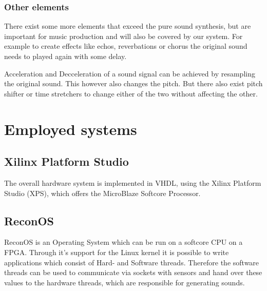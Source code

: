 			\subsubsection{Other elements}
				There exist some more elements that exceed the pure sound synthesis, but are important for music production and will also be covered by our system.
				For example to create effects like echos, reverbations or chorus the original sound needs to played again with some delay.
			
				Acceleration and Decceleration of a sound signal can be achieved by resampling the original sound. This however also changes the pitch.
				But there also exist pitch shifter or time stretchers to change either of the two without affecting the other.
		
		
		
			
			
			
		
	\section{Employed systems}
	  \subsection{Xilinx Platform Studio}
	    The overall hardware system is implemented in VHDL, using the Xilinx Platform Studio (XPS), which offers the MicroBlaze Softcore Processor.
	  \subsection{ReconOS}
		ReconOS is an Operating System which can be run on a softcore CPU on a FPGA. Through it's support for the Linux kernel it is possible to write applications which consist of Hard- and Software threads. Therefore the software threads can be used to communicate via sockets with sensors and hand over these values to the hardware threads, which are responsible for generating sounds.
